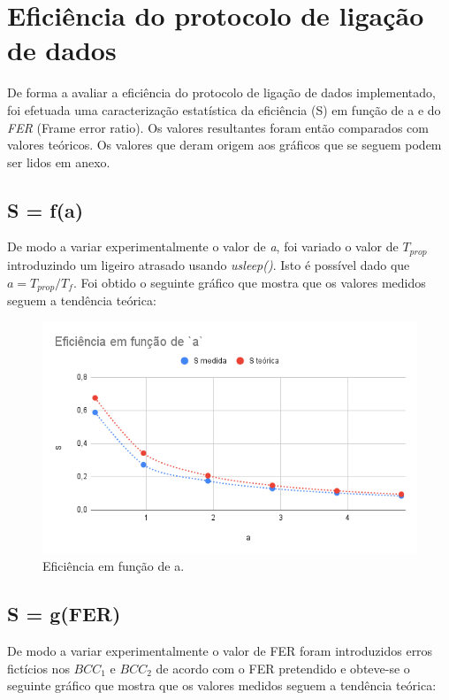 \documentclass[a4paper,11pt,portuguese]{article}
\begin{document}
\section{Eficiência do protocolo de ligação de dados}

    De forma a avaliar a eficiência do protocolo de ligação de dados implementado, foi efetuada
    uma caracterização estatística da eficiência (S) em função de a e do \textit{FER}
    (Frame error ratio). Os valores resultantes foram então comparados com valores teóricos. \hfill \break
    Os valores que deram origem aos gráficos que se seguem podem ser lidos em anexo.

    \subsection{S = f(a)}
    De modo a variar experimentalmente o valor de \textit{a}, foi variado o valor de $T_{prop}$
    introduzindo um ligeiro atrasado usando \textit{usleep()}. Isto é possível dado que
    $a = T_{prop}/T_f$. Foi obtido o seguinte gráfico que mostra que os valores medidos seguem a
    tendência teórica:

    \begin{figure}[H]
        \centering
        \includegraphics[scale=0.5]{./imgs/a.png}
        \caption{Eficiência em função de a.}
        \label{fig:a}
    \end{figure}


    \subsection{S = g(FER)}
    De modo a variar experimentalmente o valor de FER foram introduzidos erros fictícios nos
    $BCC_1$ e $BCC_2$ de acordo com o FER pretendido e obteve-se o seguinte gráfico que mostra
    que os valores medidos seguem a tendência teórica:
\end{document}
